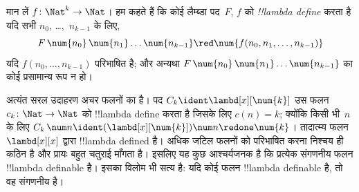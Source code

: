 \documentclass[../../../include/open-logic-section]{subfiles}
\begin{document}
\begin{defn}
मान लें $f\colon \Nat^k \to \Nat$। हम कहते हैं कि कोई लैम्ब्डा पद~$F$,
$f$ को \emph{!!{lambda define}} करता है यदि सभी $n_0$, \dots,~$n_{k-1}$
के लिए,
\[
F \, \num{n_0} \, \num{n_1} \dots \num{n_{k-1}} \red \num{f(n_0, n_1, \dots,
  n_{k-1})}
\]
यदि $f(n_0, \dots, n_{k-1})$ परिभाषित है; और अन्यथा $F \, \num{n_0}
\, \num{n_1} \dots \num{n_{k-1}}$ का कोई प्रसामान्य रूप न हो।
\end{defn}

अत्यंत सरल उदाहरण अचर फलनों का है। पद $C_k \ident \lambd[x][\num{k}]$ उस
फलन $c_k\colon \Nat \to \Nat$ को !!{lambda define} करता है जिसके लिए
$c(n) = k$; क्योंकि किसी भी~$n$ के लिए $C_k \, \num n \ident
(\lambd[x][\num{k}])\num n \redone \num{k}$। तादात्म्य फलन
$\lambd[x][x]$ द्वारा !!{lambda defined} है। अधिक जटिल फलनों को परिभाषित
करना निश्चय ही कठिन है और प्रायः बहुत चतुराई माँगता है। इसलिए यह कुछ
आश्चर्यजनक है कि प्रत्येक संगणनीय फलन !!{lambda definable} है। इसका विलोम
भी सत्य है: यदि कोई फलन !!{lambda definable} है, तो वह संगणनीय है।
\end{document}

